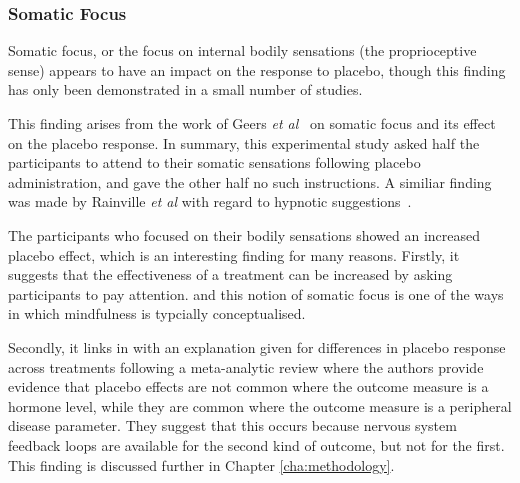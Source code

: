 


\subsubsection{Somatic Focus}

Somatic focus, or the focus on internal bodily sensations (the proprioceptive sense) appears to have an impact on the response to placebo, though this finding has only been demonstrated in a small number of studies. 

This finding arises from the work of Geers \textit{et al}~\cite{Geers2006}  on somatic focus and its effect on the placebo response. In summary, this experimental study asked half the participants to attend to their somatic sensations following placebo administration, and gave the other half no such instructions. A similiar finding was made by Rainville \textit{et al} with regard to hypnotic suggestions~\cite{Price2008}. 

The participants who focused on their bodily sensations showed an increased placebo effect, which is an interesting finding for many reasons. Firstly, it suggests that the effectiveness of a treatment can be increased by asking participants to pay attention.%
and this notion of somatic focus is one of the ways in which mindfulness is typcially conceptualised. 

Secondly, it links in with an explanation given for differences in placebo response across treatments following a meta-analytic review \cite{Meissner2007} where the authors provide evidence that placebo effects are not common where the outcome measure is a hormone level, while they are common where the outcome measure is a peripheral disease parameter. They suggest that this occurs because nervous system feedback loops are available for the second kind of outcome, but not for the first. This finding is discussed further in Chapter \ref{cha:methodology}.  


